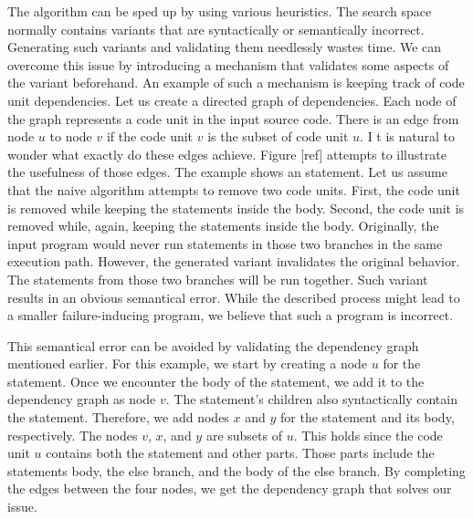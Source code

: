 The algorithm can be sped up by using various heuristics. 
The search space normally contains variants that are syntactically or 
semantically incorrect. 
Generating such variants and validating them needlessly wastes time. 
We can overcome this issue by introducing a mechanism that validates some 
aspects of the variant beforehand. 
An example of such a mechanism is keeping track of code unit dependencies. 
Let us create a directed graph of dependencies. 
Each node of the graph represents a code unit in the input source code. 
There is an edge from node $u$ to node $v$ if the code unit $v$ is 
the subset of code unit $u$. I
t is natural to wonder what exactly do these edges achieve. 
Figure [ref] attempts to illustrate the usefulness of those edges. 
The example shows an  statement. 
Let us assume that the naive algorithm attempts to remove two code units. 
First, the code unit  is removed while keeping the statements 
inside the body. 
Second, the code unit  is removed while, again, keeping 
the statements inside the body. 
Originally, the input program would never run statements in those two 
branches in the same execution path. 
However, the generated variant invalidates the original behavior. 
The statements from those two branches will be run together. 
Such variant results in an obvious semantical error. 
While the described process might lead to a smaller failure-inducing program, 
we believe that such a program is incorrect. 

This semantical error can be avoided by validating the dependency graph 
mentioned earlier.
For this example, we start by creating a node $u$ for the  
statement. 
Once we encounter the body of the  statement, we add it to 
the dependency graph as node $v$. 
The  statement's children also syntactically contain 
the  statement. 
Therefore, we add nodes $x$ and $y$ for the  statement and 
its body, respectively. 
The nodes $v$, $x$, and $y$ are subsets of $u$.  
This holds since the code unit $u$ contains both the  
statement and other parts. 
Those parts include the statements body, the else branch, and the body of 
the else branch. 
By completing the edges between the four nodes, we get the dependency graph 
that solves our issue. 

